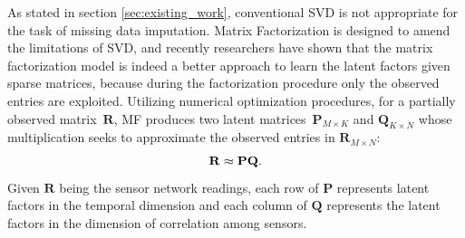 %
As stated in section \ref{sec:existing_work}, conventional SVD is not appropriate for the task of missing data imputation.
Matrix Factorization is designed to amend the limitations of SVD, and recently researchers have shown \cite{koren2009matrix} that the matrix factorization model is indeed a better approach to learn the latent factors given sparse matrices, because during the factorization procedure only the observed entries are exploited.
Utilizing numerical optimization procedures, for a partially observed matrix~$\mathbf{R}$, MF produces two latent 
matrices~$\mathbf{P}_{M \times K}$ and $\mathbf{Q}_{K \times N}$ whose multiplication seeks to approximate the observed entries in $\mathbf{R}_{M \times N}$:
\begin{equation*}\small \mathbf{R} \approx \mathbf{P} \mathbf{Q}.\end{equation*}
Given $\mathbf{R}$ being the sensor network readings, each row of $\mathbf{P}$ represents latent factors in the temporal dimension and each column of $\mathbf{Q}$ represents the latent factors in the dimension of correlation among sensors.

